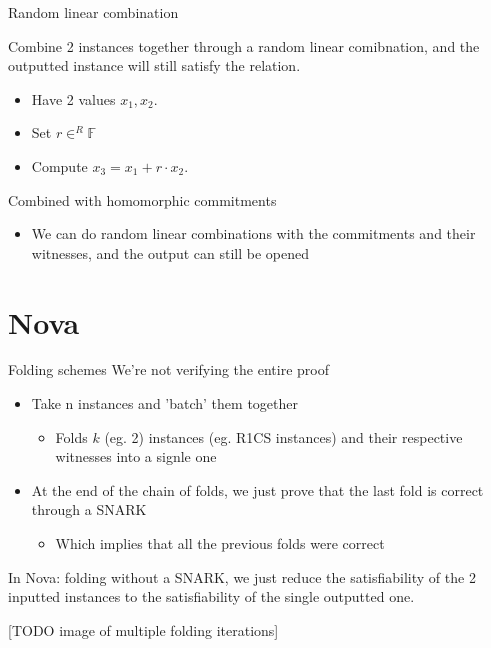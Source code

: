\documentclass{beamer}
\begin{document}

\begin{frame}{Random linear combination}

Combine 2 instances together through a random linear comibnation, and the outputted instance will still satisfy the relation.

\begin{itemize}
  \item Have 2 values $x_1, x_2$.
  \item Set $r \in^R \mathbb{F}$
  \item Compute $x_3 = x_1 + r \cdot x_2$.
\end{itemize}

\pause

Combined with homomorphic commitments
\begin{itemize}
  \item We can do random linear combinations with the commitments and their witnesses, and the output can still be opened
\end{itemize}


\end{frame}


\section[Nova]{Nova}

\begin{frame}{Folding schemes}
We're not verifying the entire proof
\begin{itemize}
   \item Take n instances and 'batch' them together
  \begin{itemize}
    \item Folds $k$ (eg. 2) instances (eg. R1CS instances) and their respective witnesses into a signle one
  \end{itemize}
   \item At the end of the chain of folds, we just prove that the last fold is correct through a SNARK
  \begin{itemize}
     \item Which implies that all the previous folds were correct
  \end{itemize}
\end{itemize}

\pause

In Nova: folding without a SNARK, we just reduce the satisfiability of the 2 inputted instances to the satisfiability of the single outputted one.

[TODO image of multiple folding iterations]

\end{frame}
\end{document}

